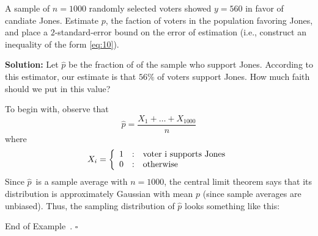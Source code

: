 \documentclass[10pt]{article}
\theoremstyle{definition}
\newtheorem{example}[theorem]{Example}
\renewenvironment{example}
{\begin{oldexample}}
  {\par\smallskip\hfill   End of Example~\theexample. $\square$    \par\end{oldexample}}
\newcommand{\vt}{\vskip 5mm} %
\newcommand{\Fl}{\vt\noindent\textbf} %
\newcommand{\1}[1]{\textbf{1}_{\left[#1\right]}} %
\begin{document}
\begin{example}[Example 8.2 in textbook]
  A sample of $n=1000$ randomly selected voters showed $y=560$ in favor of
  candiate Jones. Estimate $p$, the faction of voters in the population
  favoring Jones, and place a $2$-standard-error bound on the error of
  estimation (i.e., construct an inequality of the form \cref{eq:10}).


  \Fl{Solution:} Let $\widehat{p}$ be the fraction of of the sample who support
  Jones. According to this estimator, our estimate is that $56\%$ of voters
  support Jones. How much faith should we put in this value?


  To begin with, observe that
  \begin{equation*}
    \widehat{p} = \frac{X_{1}+\ldots+X_{1000}}{n}
  \end{equation*}
  where
  \begin{equation*}
    X_{i} = \left\{ \begin{array}{l@{\quad:\quad}l} 1 & \text{voter i supports
          Jones}\\ 0& \text{otherwise} \end{array}\right.
  \end{equation*}
  Since $\widehat{p}$~is a sample average with $n=1000$, the central limit
  theorem says that its distribution is approximately Gaussian with mean $p$
  (since sample averages are unbiased). Thus, the sampling distribution of
  $\widehat{p}$ looks something like this:
  \begin{center}
  \end{center}


\end{example}
\end{document}
